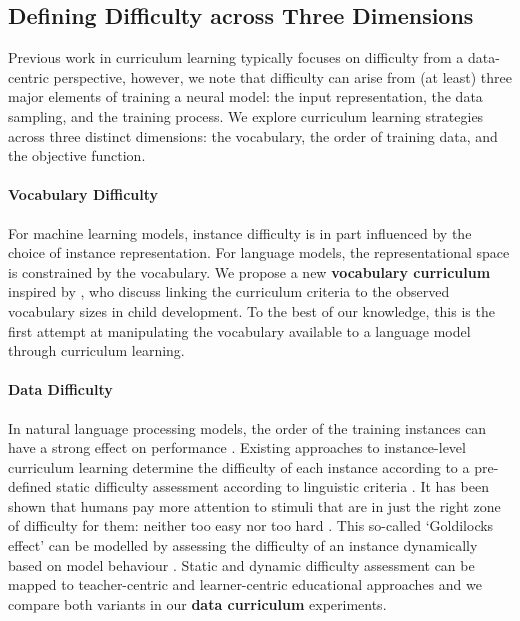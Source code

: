 \subsection{Defining Difficulty across Three Dimensions}
Previous work in curriculum learning typically focuses on difficulty from a data-centric perspective, however, we note that difficulty can arise from (at least) three major elements of training a neural model: the input representation, the data sampling, and the training process. We explore curriculum learning strategies across three distinct dimensions: the vocabulary, the order of training data, and the objective function.

\paragraph{Vocabulary Difficulty} For machine learning models, instance difficulty is in part influenced by the choice of instance representation. For language models, the representational space is constrained by the vocabulary. We propose a new \textbf{vocabulary curriculum} inspired by \citet{soviany2022curriculum}, who discuss linking the curriculum criteria to the observed vocabulary sizes in child development. To the best of our knowledge, this is the first attempt at manipulating the vocabulary available to a language model through curriculum learning.

\paragraph{Data Difficulty} In natural language processing models, the order of the training instances can have a strong effect on performance \citep{schluter2018data}. 
Existing approaches to instance-level curriculum learning determine the difficulty of each instance according to a pre-defined static difficulty assessment according to linguistic criteria \citep{campos2021curriculum,kocmi2017curriculum,liu2018curriculum,platanios2019competence}. It has been shown that humans pay more attention to stimuli that are in just the right zone of difficulty for them: neither too easy nor too hard \cite{kidd2012goldilocks}. This so-called `Goldilocks effect' can be modelled by assessing the difficulty of an instance dynamically based on model behaviour \citep{sachan2016easy,lalor2020dynamic}. Static and dynamic difficulty assessment can be mapped to teacher-centric and learner-centric educational approaches and we compare both variants in our \textbf{data curriculum} experiments. 

